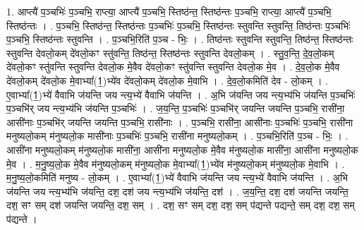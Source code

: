\documentclass[17pt]{extarticle}
\begin{document}
1. आप्त्यै॑ प॒ञ्चभिः॑ प॒ञ्चभि॒ राप्त्या॒ आप्त्यै॑ प॒ञ्चभि॒ स्तिष्ठ॑न्त॒ स्तिष्ठ॑न्तः प॒ञ्चभि॒ राप्त्या॒ आप्त्यै॑ प॒ञ्चभि॒ स्तिष्ठ॑न्तः । . प॒ञ्चभि॒ स्तिष्ठ॑न्त॒ स्तिष्ठ॑न्तः प॒ञ्चभिः॑ प॒ञ्चभि॒ स्तिष्ठ॑न्तः स्तुवन्ति स्तुवन्ति॒ तिष्ठ॑न्तः प॒ञ्चभिः॑ प॒ञ्चभि॒ स्तिष्ठ॑न्तः स्तुवन्ति । . प॒ञ्चभि॒रिति॑ प॒ञ्च - भिः॒ । . तिष्ठ॑न्तः स्तुवन्ति स्तुवन्ति॒ तिष्ठ॑न्त॒ स्तिष्ठ॑न्तः स्तुवन्ति देवलो॒कम् दे॑वलो॒कꣳ स्तु॑वन्ति॒ तिष्ठ॑न्त॒ स्तिष्ठ॑न्तः स्तुवन्ति देवलो॒कम् । . स्तु॒व॒न्ति॒ दे॒व॒लो॒कम् दे॑वलो॒कꣳ स्तु॑वन्ति स्तुवन्ति देवलो॒क मे॒वैव दे॑वलो॒कꣳ स्तु॑वन्ति स्तुवन्ति देवलो॒क मे॒व । . दे॒व॒लो॒क मे॒वैव दे॑वलो॒कम् दे॑वलो॒क मे॒वाभ्या᳚(1॒)भ्ये॑व दे॑वलो॒कम् दे॑वलो॒क मे॒वाभि । . दे॒व॒लो॒कमिति॑ देव - लो॒कम् । . ए॒वाभ्या᳚(1॒)भ्ये॑ वैवाभि ज॑यन्ति जय न्त्य॒भ्ये॑ वैवाभि ज॑यन्ति । . अ॒भि ज॑यन्ति जय न्त्य॒भ्य॑भि ज॑यन्ति प॒ञ्चभिः॑ प॒ञ्चभि॑र् जय न्त्य॒भ्य॑भि ज॑यन्ति प॒ञ्चभिः॑ । . ज॒य॒न्ति॒ प॒ञ्चभिः॑ प॒ञ्चभि॑र् जयन्ति जयन्ति प॒ञ्चभि॒ रासी॑ना॒ आसी॑नाः प॒ञ्चभि॑र् जयन्ति जयन्ति प॒ञ्चभि॒ रासी॑नाः । . प॒ञ्चभि॒ रासी॑ना॒ आसी॑नाः प॒ञ्चभिः॑ प॒ञ्चभि॒ रासी॑ना मनुष्यलो॒कम् म॑नुष्यलो॒क मासी॑नाः प॒ञ्चभिः॑ प॒ञ्चभि॒ रासी॑ना मनुष्यलो॒कम् । . प॒ञ्चभि॒रिति॑ प॒ञ्च - भिः॒ । . आसी॑ना मनुष्यलो॒कम् म॑नुष्यलो॒क मासी॑ना॒ आसी॑ना मनुष्यलो॒क मे॒वैव म॑नुष्यलो॒क मासी॑ना॒ आसी॑ना मनुष्यलो॒क मे॒व । . म॒नु॒ष्य॒लो॒क मे॒वैव म॑नुष्यलो॒कम् म॑नुष्यलो॒क मे॒वाभ्या᳚(1॒)भ्ये॑व म॑नुष्यलो॒कम् म॑नुष्यलो॒क मे॒वाभि । . म॒नु॒ष्य॒लो॒कमिति॑ मनुष्य - लो॒कम् । . ए॒वाभ्या᳚(1॒)भ्ये॑ वैवाभि ज॑यन्ति जय न्त्य॒भ्ये॑ वैवाभि ज॑यन्ति । . अ॒भि ज॑यन्ति जय न्त्य॒भ्य॑भि ज॑यन्ति॒ दश॒ दश॑ जय न्त्य॒भ्य॑भि ज॑यन्ति॒ दश॑ । . ज॒य॒न्ति॒ दश॒ दश॑ जयन्ति जयन्ति॒ दश॒ सꣳ सम् दश॑ जयन्ति जयन्ति॒ दश॒ सम् । . दश॒ सꣳ सम् दश॒ दश॒ सम् प॑द्यन्ते पद्यन्ते॒ सम् दश॒ दश॒ सम् प॑द्यन्ते । \newline
\end{document}
